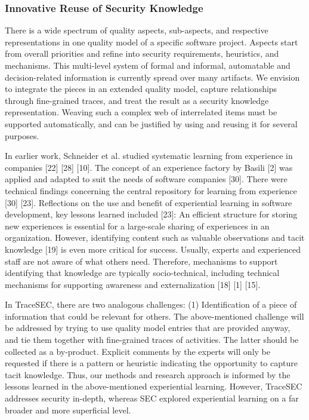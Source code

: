 \subsubsection*{Innovative Reuse of Security Knowledge}
\vspace{-1em}
There is a wide spectrum of quality aspects, sub-aspects, and respective representations in one quality model of a specific software project. Aspects start from overall priorities and refine into security requirements, heuristics, and mechanisms. This multi-level system of formal and informal, automatable and decision-related information is currently spread over many artifacts. We envision to integrate the pieces in an extended quality model, capture relationships through fine-grained traces, and treat the result as a security knowledge representation. Weaving such a complex web of interrelated items must be supported automatically, and can be justified by using and reusing it for several purposes.

In earlier work, Schneider et al. studied systematic learning from experience in companies [22] [28] [10]. The concept of an experience factory by Basili [2] was applied and adapted to suit the needs of software companies [30]. There were technical findings concerning the central repository for learning from experience [30] [23]. Reflections on the use and benefit of experiential learning in software development, key lessons learned included [23]: An efficient structure for storing new experiences is essential for a large-scale sharing of experiences in an organization. However, identifying content such as valuable observations and tacit knowledge [19] is even more critical for success. Usually, experts and experienced staff are not aware of what others need. Therefore, mechanisms to support identifying that knowledge are typically socio-technical, including technical mechanisms for supporting awareness and externalization [18] [1] [15]. 

In TraceSEC, there are two analogous challenges: (1) Identification of a piece of information that could be relevant for others. The above-mentioned challenge will be addressed by trying to use quality model entries that are provided anyway, and tie them together with fine-grained traces of activities. The latter should be collected as a by-product. Explicit comments by the experts will only be requested if there is a pattern or heuristic indicating the opportunity to capture tacit knowledge. Thus, our methods and research approach is informed by the lessons learned in the above-mentioned experiential learning. However, TraceSEC addresses security in-depth, whereas SEC explored experiential learning on a far broader and more superficial level.

